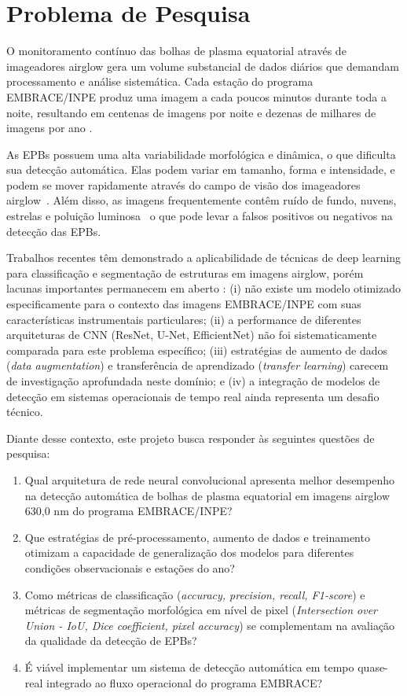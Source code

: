 \chapter{Problema de Pesquisa}

O monitoramento contínuo das bolhas de plasma equatorial através de imageadores airglow gera um volume substancial de dados diários que demandam processamento e análise sistemática. Cada estação do programa EMBRACE/INPE produz uma imagem a cada poucos minutos durante toda a noite, resultando em centenas de imagens por noite e dezenas de milhares de imagens por ano \cite{Githio2024}.

As EPBs possuem uma alta variabilidade morfológica e dinâmica, o que dificulta sua detecção automática. Elas podem variar em tamanho, forma e intensidade, e podem se mover rapidamente através do campo de visão dos imageadores airglow~\cite{Githio2024}. Além disso, as imagens frequentemente contêm ruído de fundo, nuvens, estrelas e poluição luminosa~\cite{Siddiqui2025} o que pode levar a falsos positivos ou negativos na detecção das EPBs.

Trabalhos recentes têm demonstrado a aplicabilidade de técnicas de deep learning para classificação e segmentação de estruturas em imagens airglow, porém lacunas importantes permanecem em aberto \cite{Githio2024}: (i) não existe um modelo otimizado especificamente para o contexto das imagens EMBRACE/INPE com suas características instrumentais particulares; (ii) a performance de diferentes arquiteturas de CNN (ResNet, U-Net, EfficientNet) não foi sistematicamente comparada para este problema específico; (iii) estratégias de aumento de dados (\textit{data augmentation}) e transferência de aprendizado (\textit{transfer learning}) carecem de investigação aprofundada neste domínio; e (iv) a integração de modelos de detecção em sistemas operacionais de tempo real ainda representa um desafio técnico.

Diante desse contexto, este projeto busca responder às seguintes questões de pesquisa:

\begin{enumerate}
\item Qual arquitetura de rede neural convolucional apresenta melhor desempenho na detecção automática de bolhas de plasma equatorial em imagens airglow 630,0 nm do programa EMBRACE/INPE?
\item Que estratégias de pré-processamento, aumento de dados e treinamento otimizam a capacidade de generalização dos modelos para diferentes condições observacionais e estações do ano?
\item Como métricas de classificação (\textit{accuracy, precision, recall, F1-score}) e métricas de segmentação morfológica em nível de pixel (\textit{Intersection over Union - IoU, Dice coefficient, pixel accuracy}) se complementam na avaliação da qualidade da detecção de EPBs?
\item É viável implementar um sistema de detecção automática em tempo quase-real integrado ao fluxo operacional do programa EMBRACE?
\end{enumerate}